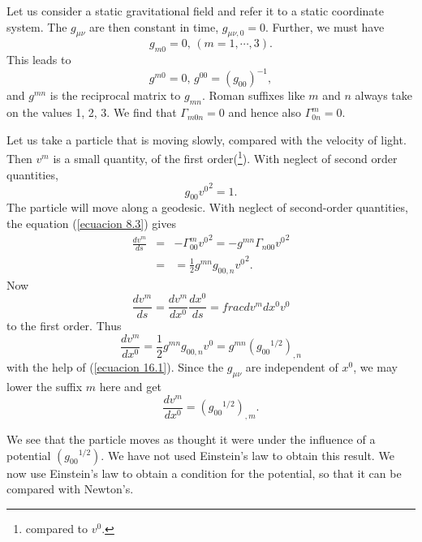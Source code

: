 Let us consider a static gravitational field and refer it to a static coordinate system. The $g_{\mu\nu}$ are then 
constant in time, $g_{\mu\nu,0} = 0$. Further, we must have 
\[
 g_{m0} = 0, \, \left( m=1,\cdots,3 \right) .
\]
This leads to
\[
 g^{m0} = 0, \, g^{00} = (g_{00})^{-1},
\]
and $g^{mn}$ is the reciprocal matrix to $g_{mn}$. Roman suffixes like $m$ and $n$ always take on the values 1, 2, 3. 
We find that $\Gamma_{m0n} = 0$ and hence also $\Gamma^{m}_{0n}=0$.

Let us take a particle that is moving slowly, compared with the velocity of light. Then $v^m$ is a small quantity, of 
the first order(\footnote{compared to $v^0$.}). With neglect of second order quantities,
\begin{equation}
 \label{ecuacion 16.1}
 g_{00} {v^{0}}^2 = 1.
\end{equation}
The particle will move along a geodesic. With neglect of second-order quantities, the equation (\ref{ecuacion 8.3}) 
gives
\[
\begin{array}{rcl}
 \frac{dv^m}{ds} & = & -\Gamma^m_{00}{v^0}^2 = -g^{mn} \Gamma_{n00}{v^0}^2\\
                 & = & = \frac{1}{2} g^{mn}g_{00,n} {v^0}^2. 
\end{array}
\]
Now
\[
 \frac{dv^m}{ds} = \frac{dv^m}{dx^0} \frac{dx^0}{ds} = frac{dv^m}{dx^0}v^0
\]
to the first order. Thus
\begin{equation}
 \label{ecuacion 16.2}
 \frac{dv^m}{dx^0} = \frac{1}{2} g^{mn}g_{00,n}v^0 = g^{mn}\left( {g_{00}}^{1/2} \right)_{,n}
\end{equation}
with the help of (\ref{ecuacion 16.1}). Since the $g_{\mu\nu}$ are independent of $x^0$, we may lower the suffix $m$ 
here and get
\begin{equation}
 \label{ecuacion 16.3}
 \frac{dv^m}{dx^0} = \left( {g_{00}}^{1/2} \right)_{,m} .
\end{equation}

We see that the particle moves as thought it were under the influence of a potential $\left({g_{00}}^{1/2}\right)$. We 
have not used Einstein's law to obtain this result. We now use Einstein's law to obtain a condition for the potential, 
so that it can be compared with Newton's.

